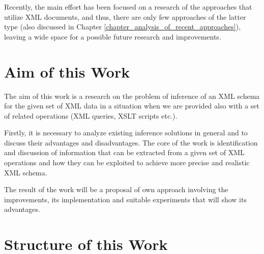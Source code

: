 Recently, the main effort has been focused on a research of the approaches that utilize XML documents, and thus, there are only few approaches of the latter type (also discussed in Chapter \ref{chapter_analysis_of_recent_approaches}), leaving a wide space for a possible future research and improvements.

\section{Aim of this Work}
The aim of this work is a research on the problem of inference of an XML schema for the given set of XML data in a situation when we are provided also with a set of related operations (XML queries, XSLT scripts etc.).

Firstly, it is necessary to analyze existing inference solutions in general and to discuss their advantages and disadvantages. The core of the work is identification and discussion of information that can be extracted from a given set of XML operations and how they can be exploited to achieve more precise and realistic XML schema.

The result of the work will be a proposal of own approach involving the improvements, its implementation and suitable experiments that will show its advantages.

\section{Structure of this Work}
